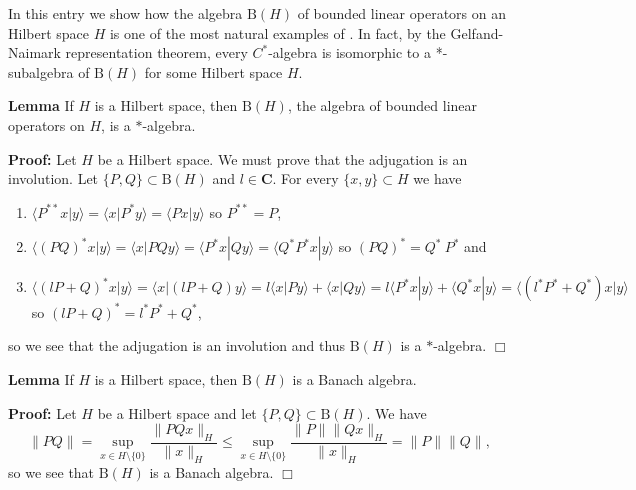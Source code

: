 \documentclass[12pt]{article}
\newenvironment{lm}{\par\noindent\textbf{Lemma }}{}
\newenvironment{prf}{\par\noindent\textbf{Proof: }}{$\Box$}
\begin{document}
In this entry we show how the algebra $\mathrm{B}(H)$ of bounded linear operators on an Hilbert space $H$ is one of the most natural examples of . In fact, by the Gelfand-Naimark representation theorem, every $C^*$-algebra is isomorphic to a *-subalgebra of $\mathrm{B}(H)$ for some Hilbert space $H$.

\begin{lm}
If $H$ is a Hilbert space, then $\mathrm{B}(H)$, the algebra of bounded linear operators on $H$, is a $*$-algebra.
\end{lm}
\begin{prf}
Let $H$ be a Hilbert space. We must prove that the adjugation is an involution.
Let $\{P, Q\} \subset \mathrm{B}(H)$ and $l \in \mathbf{C}$. For every $\{x, y\} \subset H$ we have
\begin{enumerate}
\item $\langle P^{**} x | y \rangle = \langle x | P^*y \rangle = \langle P x | y \rangle$ so $P^{**} = P$,
\item $\langle (PQ)^* x | y \rangle = \langle x | PQ y \rangle = \langle P^* x | Q y \rangle = \langle Q^* P^* x | y \rangle$ so $(PQ)^* = Q^*\
P^*$ and
\item $\langle (lP+Q)^* x | y \rangle = \langle x | (lP+Q) y \rangle = l \langle x | Py \rangle + \langle x | Qy \rangle = l\langle P^* x | y \rangle + \langle Q^* x | y \rangle = \langle (l^*P^* + Q^*) x | y \rangle$ so $(lP+Q)^* = l^*P^* + Q^*$,
\end{enumerate}
so we see that the adjugation is an involution and thus $\mathrm{B}(H)$ is a $*$-algebra.
\end{prf}

\begin{lm}
If $H$ is a Hilbert space, then $\mathrm{B}(H)$ is a Banach algebra.
\end{lm}
\begin{prf}
Let $H$ be a Hilbert space and let $\{P, Q\} \subset \mathrm{B}(H)$. We have
$$\|PQ\| = \sup_{x \in H \setminus \{0\} } \frac{\| PQx \|_H}{\| x \|_H} \le \sup_{x \in H \setminus \{0\} } \frac{\|P\| \| Qx \|_H}{\| x \|_H\
} = \|P\| \|Q\|,$$
so we see that $\mathrm{B}(H)$ is a Banach algebra.
\end{prf}
\end{document}
